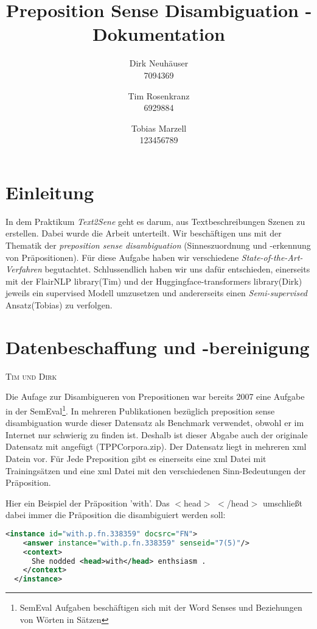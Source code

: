 \documentclass[10pt,a4paper]{article}
\newcommand{\chapterauthor}[1]{%
	{\parindent0pt\vspace*{-5pt}\hspace*{\fill}%
  \linespread{1.1}\large\scshape#1%
  \par\nobreak\vspace*{10pt}}
}
\begin{document}
\title{Preposition Sense Disambiguation - Dokumentation}
 
\author{
Dirk Neuhäuser \\ 7094369
\and
Tim Rosenkranz \\ 6929884
\and 
Tobias Marzell \\ 123456789
}

\maketitle
\tableofcontents

\section{Einleitung}
In dem Praktikum \textit{Text2Sene} geht es darum, aus Textbeschreibungen Szenen zu erstellen. Dabei wurde die Arbeit unterteilt. Wir beschäftigen uns mit der Thematik der \textit{preposition sense disambiguation} (Sinneszuordnung und -erkennung von Präpositionen). Für diese Aufgabe haben wir verschiedene \textit{State-of-the-Art-Verfahren} begutachtet. Schlussendlich haben wir uns dafür entschieden, einerseits mit der FlairNLP library(Tim) und der Huggingface-transformers library(Dirk) jeweils ein supervised Modell umzusetzen und andererseits einen \textit{Semi-supervised} Ansatz(Tobias) zu verfolgen.

\newpage

\section{Datenbeschaffung und -bereinigung}
\chapterauthor{Tim und Dirk}
Die Aufage zur Disambigueren von Prepositionen war bereits 2007 eine Aufgabe in der SemEval\footnote{SemEval Aufgaben beschäftigen sich mit der Word Senses und Beziehungen von Wörten in Sätzen}. In mehreren Publikationen bezüglich preposition sense disambiguation wurde dieser Datensatz als Benchmark verwendet, obwohl er im Internet nur schwierig zu finden ist. Deshalb ist dieser Abgabe auch der originale Datensatz mit angefügt (TPPCorpora.zip). Der Datensatz liegt in mehreren xml Datein vor. Für Jede Preposition gibt es einerseits eine xml Datei mit Trainingsätzen und eine xml Datei mit den verschiedenen Sinn-Bedeutungen der Präposition.

Hier ein Beispiel der Präposition 'with'. Das $<$head$>$ $<$/head$>$ umschließt dabei immer die Präposition die disambiguiert werden soll: 

\begin{lstlisting}[language=xml]
  <instance id="with.p.fn.338359" docsrc="FN">
    <answer instance="with.p.fn.338359" senseid="7(5)"/>
    <context>
      She nodded <head>with</head> enthsiasm .
    </context>
  </instance>
\end{lstlisting}
\end{document}
